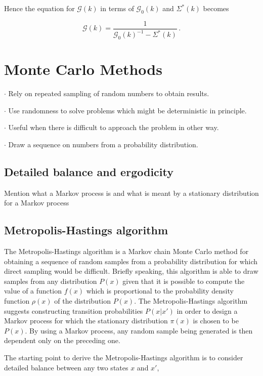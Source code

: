 \documentclass[12pt]{report}
\newcommand{\Gt}{\mathcal{G}}
\newcommand{\todo}[1]{{\leavevmode\color{todo}#1}}
\begin{document}
Hence the equation for $ \Gt(k) $ in terms of $ \Gt_0(k) $ and $ \Sigma^*(k) $ becomes

\begin{equation}
	\Gt(k) = \frac{1}{\Gt_0(k)^{-1} - \Sigma^*(k)} \,.
\end{equation}


\section{Monte Carlo Methods}

\todo{$ \cdot $ Rely on repeated sampling of random numbers to obtain results.}

\todo{$ \cdot $ Use randomness to solve problems which might be deterministic in principle.}

\todo{$ \cdot $ Useful when there is difficult to approach the problem in other way.}

\todo{$ \cdot $ Draw a sequence on numbers from a probability distribution.}

\subsection{Detailed balance and ergodicity}

\todo{Mention what a Markov process is and what is meant by a stationary distribution for a Markov process}

\subsection{Metropolis-Hastings algorithm} \label{section:MEA}

The Metropolis-Hastings algorithm is a Markov chain Monte Carlo method for obtaining a sequence of random samples from a probability distribution for which direct sampling would be difficult. Briefly speaking, this algorithm is able to draw samples from any distribution $ P(x) $ given that it is possible to compute the value of a function $ f(x) $ which is proportional to the probability density function $ \rho(x) $ of the distribution $ P(x) $. The Metropolis-Hastings algorithm suggests constructing transition probabilities $ P(x|x') $ in order to design a Markov process for which the stationary distribution $ \pi(x) $ is chosen to be $ P(x) $. By using a Markov process, any random sample being generated is then dependent only on the preceding one.

The starting point to derive the Metropolis-Hastings algorithm is to consider detailed balance between any two states $ x $ and $ x' $,
\end{document}
